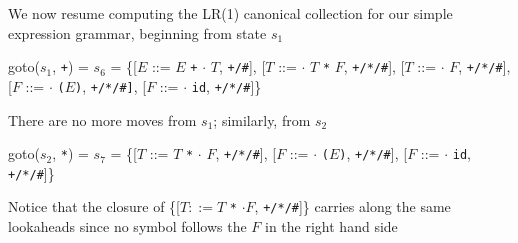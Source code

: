 \documentclass[8pt,a4paper,compress,handout]{beamer}
\newcommand{\mm}[1]{$#1$}
\newcommand{\subs}[2]{${#1}_{#2}$}
\newenvironment{spaced}
{
\smallskip
\hspace{.5cm}
\begin{minipage}[c]{\textwidth}
}
{
\end{minipage}
\smallskip
}
\begin{document}
\begin{frame}[fragile]
\pause

We now resume computing the LR(1) canonical collection for our simple expression grammar, beginning from state $s_1$

\text{ }
\begin{spaced}
\begin{production}
goto(\subs{s}{1}, \lstinline{+}) = \subs{s}{6}
               = \{[\mm{E}  ::= \mm{E} \lstinline{+} \mm{\cdot} \mm{T}, \lstinline{+/#}],
                    [\mm{T}  ::= \mm{\cdot} \mm{T} \lstinline{*} \mm{F}, \lstinline{+/*/#}],
                    [\mm{T}  ::= \mm{\cdot} \mm{F}, \lstinline{+/*/#}],
                    [\mm{F}  ::= \mm{\cdot} \lstinline{(}\mm{E}\lstinline{)},  \lstinline{+/*/#]},
                    [\mm{F}  ::= \mm{\cdot} \lstinline{id}, \lstinline{+/*/#}]\}
\end{production}
\end{spaced}

\pause

There are no more moves from $s_1$; similarly, from $s_2$

\text{ }
\begin{spaced}
\begin{production}
goto(\subs{s}{2}, \lstinline{*}) = \subs{s}{7}
               = \{[\mm{T}  ::= \mm{T} \lstinline{*} \mm{\cdot} \mm{F}, \lstinline{+/*/#}],
                    [\mm{F}  ::= \mm{\cdot} \lstinline{(}\mm{E}\lstinline{)}, \lstinline{+/*/#}],
                    [\mm{F}  ::= \mm{\cdot} \lstinline{id}, \lstinline{+/*/#}]\}
\end{production}
\end{spaced}

\pause

Notice that the closure of  \{[$T  ::= T$ \lstinline{*} $\cdot F$, \lstinline{+/*/#}]\} carries along the same lookaheads since no symbol follows the $F$ in the right hand side
\end{frame}
\end{document}
